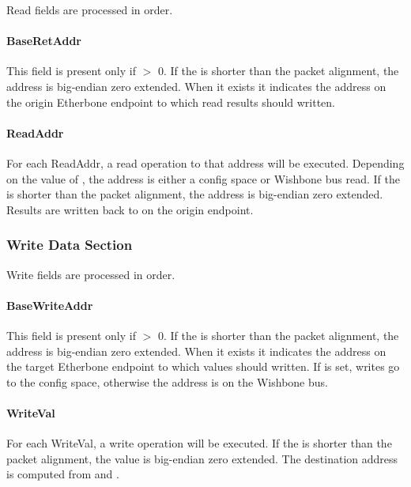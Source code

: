 \documentclass{article}
\begin{document}
Read fields are processed in order.

\paragraph{BaseRetAddr} \label{field:BaseRetAddr}
This field is present only if  $>$ 0.
If the  is shorter than the packet alignment, 
the address is big-endian zero extended.
When it exists it indicates the address on the origin Etherbone endpoint 
to which read results should written.

\paragraph{ReadAddr} \label{field:ReadAddr}
For each ReadAddr, 
a read operation to that address will be executed.
Depending on the value of ,
the address is either a config space or Wishbone bus read.
If the  is shorter than the packet alignment, 
the address is big-endian zero extended.
Results are written back to  on the origin endpoint.

\subsubsection{Write Data Section}

Write fields are processed in order.

\paragraph{BaseWriteAddr} \label{field:BaseWriteAddr}
This field is present only if  $>$ 0.
If the  is shorter than the packet alignment, 
the address is big-endian zero extended.
When it exists it indicates the address on the target Etherbone endpoint 
to which values should written.
If  is set,
writes go to the config space,
otherwise the address is on the Wishbone bus.

\paragraph{WriteVal} \label{field:WriteVal}
For each WriteVal, 
a write operation will be executed.
If the  is shorter than the packet alignment, 
the value is big-endian zero extended.
The destination address is computed from  and 
.
\end{document}
